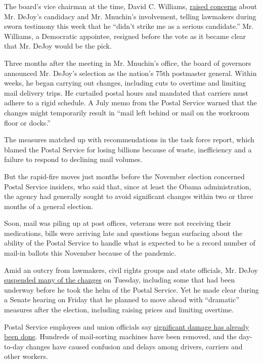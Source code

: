 The board's vice chairman at the time, David C. Williams,
\href{https://www.nytimes3xbfgragh.onion/2020/08/20/us/politics/former-postal-governor-tells-congress-mnuchin-politicized-postal-service.html}{raised
concerns} about Mr. DeJoy's candidacy and Mr. Mnuchin's involvement,
telling lawmakers during sworn testimony this week that he ``didn't
strike me as a serious candidate.'' Mr. Williams, a Democratic
appointee, resigned before the vote as it became clear that Mr. DeJoy
would be the pick.

Three months after the meeting in Mr. Mnuchin's office, the board of
governors announced Mr. DeJoy's selection as the nation's 75th
postmaster general. Within weeks, he began carrying out changes,
including cuts to overtime and limiting mail delivery trips. He
curtailed postal hours and mandated that carriers must adhere to a rigid
schedule. A July memo from the Postal Service warned that the changes
might temporarily result in ``mail left behind or mail on the workroom
floor or docks.''

The measures matched up with recommendations in the task force report,
which blamed the Postal Service for losing billions because of waste,
inefficiency and a failure to respond to declining mail volumes.

But the rapid-fire moves just months before the November election
concerned Postal Service insiders, who said that, since at least the
Obama administration, the agency had generally sought to avoid
significant changes within two or three months of a general election.

Soon, mail was piling up at post offices, veterans were not receiving
their medications, bills were arriving late and questions began
surfacing about the ability of the Postal Service to handle what is
expected to be a record number of mail-in ballots this November because
of the pandemic.

Amid an outcry from lawmakers, civil rights groups and state officials,
Mr. DeJoy
\href{https://www.nytimes3xbfgragh.onion/2020/08/18/us/politics/postal-service-suspends-changes.html}{suspended
many of the changes} on Tuesday, including some that had been underway
before he took the helm of the Postal Service. Yet he made clear during
a Senate hearing on Friday that he planned to move ahead with
``dramatic'' measures after the election, including raising prices and
limiting overtime.

Postal Service employees and union officials say
\href{https://www.nytimes3xbfgragh.onion/2020/08/19/business/economy/postal-service-changes-dejoy.html}{significant
damage has already been done}. Hundreds of mail-sorting machines have
been removed, and the day-to-day changes have caused confusion and
delays among drivers, carriers and other workers.

